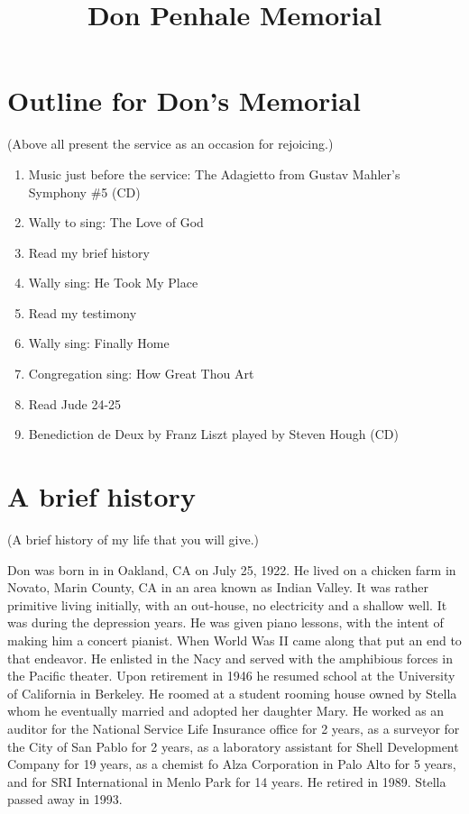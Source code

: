 \documentclass{article}
\title{Don Penhale Memorial}
\begin{document}
\maketitle
\section{Outline for Don's Memorial}
(Above all present the service as an occasion for rejoicing.)
\begin{enumerate}
\item Music just before the service: 
        The Adagietto from Gustav Mahler's Symphony \#5 (CD)
\item Wally to sing: The Love of God
\item Read my brief history
\item Wally sing: He Took My Place
\item Read my testimony
\item Wally sing: Finally Home
\item Congregation sing: How Great Thou Art
\item Read Jude 24-25
\item Benediction de Deux by Franz Liszt played by Steven Hough (CD)
\end{enumerate}

\section{A brief history}
(A brief history of my life that you will give.)

Don was born in in Oakland, CA on July 25, 1922.
He lived on a chicken farm in Novato, Marin County, CA in an area
    known as Indian Valley.
It was rather primitive living initially, with an out-house,
    no electricity and a shallow well.
It was during the depression years.
He was given piano lessons, with the intent of making him a concert pianist.
When World Was II came along that put an end to that endeavor.
He enlisted in the Nacy and served with the amphibious forces
    in the Pacific theater.
Upon retirement in 1946 he resumed school at the University of California
    in Berkeley.
He roomed at a student rooming house owned by Stella whom he eventually married
    and adopted her daughter Mary.
He worked as an auditor for 
    the National Service Life Insurance office for 2 years,
    as a surveyor for the City of San Pablo for 2 years,
    as a laboratory assistant for Shell Development Company for 19 years,
    as a chemist fo Alza Corporation in Palo Alto for 5 years,
    and for SRI International in Menlo Park for 14 years.
He retired in 1989.
Stella passed away in 1993.
\end{document}

